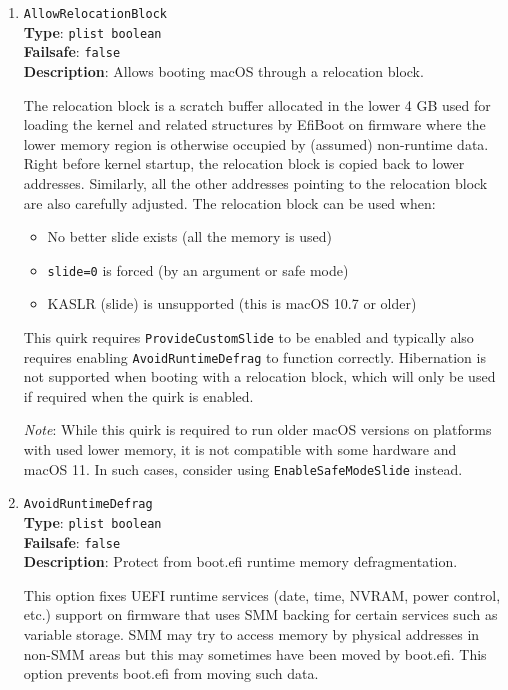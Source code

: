\documentclass[]{article}
\providecommand{\tightlist}{%
  \setlength{\itemsep}{0pt}\setlength{\parskip}{0pt}}
\begin{document}
\begin{enumerate}

\item
  \texttt{AllowRelocationBlock}\\
  \textbf{Type}: \texttt{plist\ boolean}\\
  \textbf{Failsafe}: \texttt{false}\\
  \textbf{Description}: Allows booting macOS through a relocation block.

  The relocation block is a scratch buffer allocated in the lower 4 GB used
  for loading the kernel and related structures by EfiBoot on firmware where
  the lower memory region is otherwise occupied by (assumed) non-runtime data.
  Right before kernel startup, the relocation block is copied back to lower
  addresses. Similarly, all the other addresses pointing to the relocation
  block are also carefully adjusted. The relocation block can be used when:

  \begin{itemize}
    \tightlist
    \item No better slide exists (all the memory is used)
    \item \texttt{slide=0} is forced (by an argument or safe mode)
    \item KASLR (slide) is unsupported (this is macOS 10.7 or older)
  \end{itemize}

  This quirk requires \texttt{ProvideCustomSlide} to be enabled and
  typically also requires enabling \texttt{AvoidRuntimeDefrag} to function
  correctly. Hibernation is not supported when booting with a relocation
  block, which will only be used if required when the quirk is enabled.

  \emph{Note}: While this quirk is required to run older macOS versions
  on platforms with used lower memory, it is not compatible with some
  hardware and macOS 11. In such cases, consider using
  \texttt{EnableSafeModeSlide} instead.

\item
  \texttt{AvoidRuntimeDefrag}\\
  \textbf{Type}: \texttt{plist\ boolean}\\
  \textbf{Failsafe}: \texttt{false}\\
  \textbf{Description}: Protect from boot.efi runtime memory defragmentation.

  This option fixes UEFI runtime services (date, time, NVRAM, power control, etc.)
  support on firmware that uses SMM backing for certain services such as variable
  storage. SMM may try to access memory by physical addresses in non-SMM areas but
  this may sometimes have been moved by boot.efi. This option prevents boot.efi
  from moving such data.


\end{enumerate}
\end{document}
